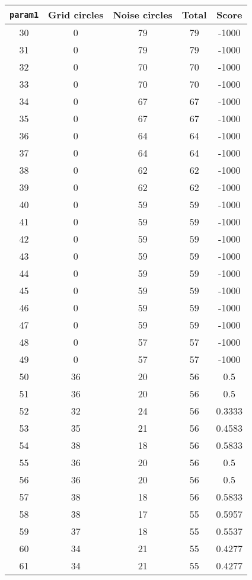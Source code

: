 \documentclass[letterpaper, 12pt]{article}
\begin{document}
\begin{longtable}{|c|c|c|c|c|}
\hline
\textbf{\texttt{param1}} & \textbf{Grid circles} & \textbf{Noise circles} & \textbf{Total} & \textbf{Score} \\
\hline
30 & 0 & 79 & 79 & -1000 \\
\hline
31 & 0 & 79 & 79 & -1000 \\
\hline
32 & 0 & 70 & 70 & -1000 \\
\hline
33 & 0 & 70 & 70 & -1000 \\
\hline
34 & 0 & 67 & 67 & -1000 \\
\hline
35 & 0 & 67 & 67 & -1000 \\
\hline
36 & 0 & 64 & 64 & -1000 \\
\hline
37 & 0 & 64 & 64 & -1000 \\
\hline
38 & 0 & 62 & 62 & -1000 \\
\hline
39 & 0 & 62 & 62 & -1000 \\
\hline
40 & 0 & 59 & 59 & -1000 \\
\hline
41 & 0 & 59 & 59 & -1000 \\
\hline
42 & 0 & 59 & 59 & -1000 \\
\hline
43 & 0 & 59 & 59 & -1000 \\
\hline
44 & 0 & 59 & 59 & -1000 \\
\hline
45 & 0 & 59 & 59 & -1000 \\
\hline
46 & 0 & 59 & 59 & -1000 \\
\hline
47 & 0 & 59 & 59 & -1000 \\
\hline
48 & 0 & 57 & 57 & -1000 \\
\hline
49 & 0 & 57 & 57 & -1000 \\
\hline
50 & 36 & 20 & 56 & 0.5 \\
\hline
51 & 36 & 20 & 56 & 0.5 \\
\hline
52 & 32 & 24 & 56 & 0.3333 \\
\hline
53 & 35 & 21 & 56 & 0.4583 \\
\hline
54 & 38 & 18 & 56 & 0.5833 \\
\hline
55 & 36 & 20 & 56 & 0.5 \\
\hline
56 & 36 & 20 & 56 & 0.5 \\
\hline
57 & 38 & 18 & 56 & 0.5833 \\
\hline
58 & 38 & 17 & 55 & 0.5957 \\
\hline
59 & 37 & 18 & 55 & 0.5537 \\
\hline
60 & 34 & 21 & 55 & 0.4277 \\
\hline
61 & 34 & 21 & 55 & 0.4277 \\

\end{longtable}
\end{document}
